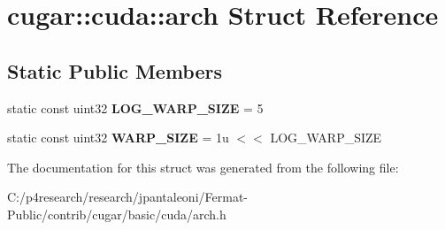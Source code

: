 \hypertarget{structcugar_1_1cuda_1_1arch}{}\section{cugar\+:\+:cuda\+:\+:arch Struct Reference}
\label{structcugar_1_1cuda_1_1arch}
\subsection*{Static Public Members}
\begin{DoxyCompactItemize}
\item 
\mbox{\label{structcugar_1_1cuda_1_1arch_a8277e66b99b3db0615d6f411def5393c}} 
static const uint32 {\bfseries L\+O\+G\+\_\+\+W\+A\+R\+P\+\_\+\+S\+I\+ZE} = 5
\item 
\mbox{\label{structcugar_1_1cuda_1_1arch_ab55035c87866dd001cfeafdf1d4e792a}} 
static const uint32 {\bfseries W\+A\+R\+P\+\_\+\+S\+I\+ZE} = 1u $<$$<$ L\+O\+G\+\_\+\+W\+A\+R\+P\+\_\+\+S\+I\+ZE
\end{DoxyCompactItemize}


The documentation for this struct was generated from the following file\+:\begin{DoxyCompactItemize}
\item 
C\+:/p4research/research/jpantaleoni/\+Fermat-\/\+Public/contrib/cugar/basic/cuda/arch.\+h\end{DoxyCompactItemize}
